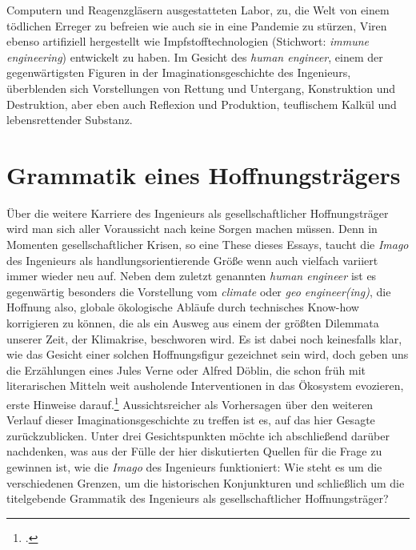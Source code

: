 \documentclass[%
	fontsize=10pt,%
	twoside,%
	headings=optiontoheadandtoc,%
	showtrims]{scrbook}
\newcommand{\antiqua}[3]{%
	\fontsize{#1}{#2}%
	\Lyon%
	\addfontfeature{LetterSpace=#3}%
	\selectfont%
}
\newcommand{\regularfontantiqua}{%
	\normalfont%
	\antiqua{9.3bp}{12bp}{.05}%
}
\newcommand{\regularfontdefault}{%
	\regularfontantiqua%
}
\renewcommand{\texttt}{\nohyphens} %
\begin{document}
Computern und Reagenzgläsern ausgestatteten Labor, zu, die Welt von einem tödlichen Erreger zu befreien wie auch sie in eine Pandemie zu stürzen, Viren ebenso artifiziell hergestellt wie Impfstofftechnologien (Stichwort: \emph{immune engineering}) entwickelt zu haben. Im Gesicht des \emph{human engineer}, einem der gegenwärtigsten Figuren in der Imaginationsgeschichte des Ingenieurs, überblenden sich Vorstellungen von Rettung und Untergang, Konstruktion und Destruktion, aber eben auch Reflexion und Produktion, teuflischem Kalkül und lebensrettender \texttt{Substanz}.%
%
					
						\chapter[head={Grammatik eines Hoffnungs\-trägers}, tocentry={GRAMMATIK EINES HOFFNUNGS\-TRÄGERS}]{Grammatik eines Hoffnungs\-trägers}%
					
					\-
					\par			
					\newpage%
					\noindent%
					\regularfontdefault%
	\par\noindent Über die weitere Karriere des Ingenieurs als gesellschaftlicher Hoffnungsträger wird man sich aller Voraussicht nach keine Sorgen machen müssen. Denn in Momenten gesellschaftlicher Krisen, so eine These dieses Essays, taucht die \emph{Imago} des Ingenieurs als handlungsorientierende Größe \textendash{} wenn auch vielfach variiert \textendash{} immer wieder neu auf. Neben dem zuletzt genannten \emph{human engineer} ist es gegenwärtig besonders die Vorstellung vom \emph{climate} oder \emph{geo engineer(ing)}, die Hoffnung also, globale ökologische Abläufe durch technisches Know-how korrigieren zu können, die als ein Ausweg aus einem der größten Dilemmata unserer Zeit, der Klimakrise, beschworen wird. Es ist dabei noch keinesfalls klar, wie das Gesicht einer solchen Hoffnungsfigur gezeichnet sein wird, doch geben uns die Erzählungen eines Jules Verne oder Alfred Döblin, die schon früh mit literarischen Mitteln weit ausholende Interventionen in das Ökosystem evozieren, erste Hinweise darauf.\footnote{\cite[][]{buettner2021a}.}  Aussichtsreicher als Vorhersagen über den weiteren Verlauf dieser Imaginationsgeschichte zu treffen ist es, auf das hier Gesagte zurückzublicken. Unter drei Gesichtspunkten möchte ich abschließend darüber nachdenken, was aus der Fülle der hier diskutierten Quellen für die Frage zu gewinnen ist, wie die \emph{Imago} des Ingenieurs funktioniert: Wie steht es um die verschiedenen Grenzen, um die historischen Konjunkturen und schließlich um die titelgebende Grammatik des Ingenieurs als gesellschaftlicher Hoffnungsträger?
\end{document}

